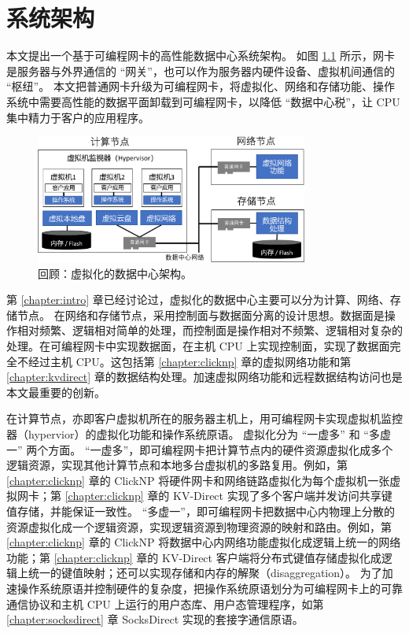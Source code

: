 \chapter{系统架构}

本文提出一个基于可编程网卡的高性能数据中心系统架构。
如图 \ref{arch:fig:virt-architecture} 所示，网卡是服务器与外界通信的 ``网关''，也可以作为服务器内硬件设备、虚拟机间通信的 ``枢纽''。
本文把普通网卡升级为可编程网卡，将虚拟化、网络和存储功能、操作系统中需要高性能的数据平面卸载到可编程网卡，以降低 ``数据中心税''，让 CPU 集中精力于客户的应用程序。


\begin{figure}[htbp]
	\centering
	\includegraphics[width=0.8\textwidth]{figures/virt_arch.pdf}
	\caption{回顾：虚拟化的数据中心架构。}
	\label{arch:fig:virt-architecture}
\end{figure}

第 \ref{chapter:intro} 章已经讨论过，虚拟化的数据中心主要可以分为计算、网络、存储节点。
在网络和存储节点，采用控制面与数据面分离的设计思想。数据面是操作相对频繁、逻辑相对简单的处理，而控制面是操作相对不频繁、逻辑相对复杂的处理。在可编程网卡中实现数据面，在主机 CPU 上实现控制面，实现了数据面完全不经过主机 CPU。这包括第 \ref{chapter:clicknp} 章的虚拟网络功能和第 \ref{chapter:kvdirect} 章的数据结构处理。加速虚拟网络功能和远程数据结构访问也是本文最重要的创新。

在计算节点，亦即客户虚拟机所在的服务器主机上，用可编程网卡实现虚拟机监控器（hypervior）的虚拟化功能和操作系统原语。
虚拟化分为 ``一虚多'' 和 ``多虚一'' 两个方面。
``一虚多''，即可编程网卡把计算节点内的硬件资源虚拟化成多个逻辑资源，实现其他计算节点和本地多台虚拟机的多路复用。例如，第 \ref{chapter:clicknp} 章的 ClickNP 将硬件网卡和网络链路虚拟化为每个虚拟机一张虚拟网卡；第 \ref{chapter:clicknp} 章的 KV-Direct 实现了多个客户端并发访问共享键值存储，并能保证一致性。
``多虚一''，即可编程网卡把数据中心内物理上分散的资源虚拟化成一个逻辑资源，实现逻辑资源到物理资源的映射和路由。例如，第 \ref{chapter:clicknp} 章的 ClickNP 将数据中心内网络功能虚拟化成逻辑上统一的网络功能；第 \ref{chapter:clicknp} 章的 KV-Direct 客户端将分布式键值存储虚拟化成逻辑上统一的键值映射；还可以实现存储和内存的解聚（disaggregation）。
为了加速操作系统原语并控制硬件的复杂度，把操作系统原语划分为可编程网卡上的可靠通信协议和主机 CPU 上运行的用户态库、用户态管理程序，如第 \ref{chapter:socksdirect} 章 SocksDirect 实现的套接字通信原语。

